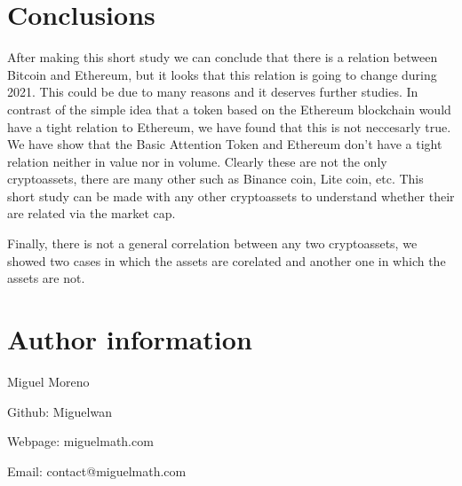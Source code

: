 \documentclass[11pt]{article}
\begin{document}
    \section{Conclusions}\label{conclusions}

After making this short study we can conclude that there is a relation
between Bitcoin and Ethereum, but it looks that this relation is going
to change during 2021. This could be due to many reasons and it deserves
further studies. In contrast of the simple idea that a token based on
the Ethereum blockchain would have a tight relation to Ethereum, we have
found that this is not neccesarly true. We have show that the Basic
Attention Token and Ethereum don't have a tight relation neither in
value nor in volume. Clearly these are not the only cryptoassets, there
are many other such as Binance coin, Lite coin, etc. This short study
can be made with any other cryptoassets to understand whether their are
related via the market cap.

Finally, there is not a general correlation between any two
cryptoassets, we showed two cases in which the assets are corelated and
another one in which the assets are not.

\section{Author information}

Miguel Moreno

Github: Miguelwan

Webpage: miguelmath.com

Email: contact@miguelmath.com


    
    
    
    
\end{document}
